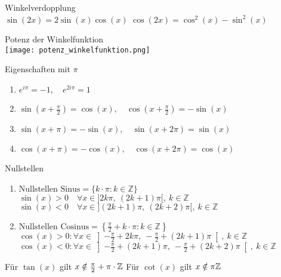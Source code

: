 \begin{corollary}{Winkelverdopplung}\\
        $\sin(2x) = 2 \sin(x)\cos(x)$ \hspace{4mm} $\cos(2x) = \cos^2(x) - \sin^2(x)$
\end{corollary}

\begin{corollary}{Potenz der Winkelfunktion}\\
    \texttt{[image: potenz\_winkelfunktion.png]}
\end{corollary}

\begin{corollary}{Eigenschaften mit $\pi$}
    \begin{enumerate}[itemsep= 2pt]
        \item $e^{i\pi} = -1, \quad e^{2i\pi} = 1$
        \item $\sin\left(x + \frac{\pi}{2}\right) = \cos(x), \quad \cos\left(x + \frac{\pi}{2}\right) = -\sin(x)$
        \item $\sin(x+\pi) = -\sin (x), \quad \sin(x + 2\pi) = \sin(x)$
        \item $\cos(x+\pi) = -\cos (x), \quad \cos(x + 2\pi) = \cos(x)$
    \end{enumerate}
\end{corollary}

\begin{corollary}{Nullstellen}
    \begin{enumerate}
         \item $\text{Nullstellen Sinus} = \{k\cdot \pi : k\in \mathbb{Z}\}$\\
        $\sin(x) > 0 \quad \forall x \in ]2k\pi, ~(2k+1)\pi[, ~ k\in \mathbb{Z}$\\[2pt]
        $\sin(x) < 0 \quad \forall x \in ](2k + 1)\pi, ~(2k+2)\pi[, ~ k\in \mathbb{Z}$
        \item $\text{Nullstellen Cosinus} = \left\{\frac{\pi}{2}+k\cdot \pi : k\in \mathbb{Z}\right\}$\\
        $\cos(x) > 0:\forall x \in \left]-\frac{\pi}{2} +2k\pi, ~-\frac{\pi}{2} +(2k+1)\pi\right[, ~ k\in \mathbb{Z}$\\[2pt]
        $\cos(x) < 0:\forall x \in \left]-\frac{\pi}{2} + (2k + 1)\pi, ~-\frac{\pi}{2} +(2k+2)\pi\right[, ~ k\in \mathbb{Z}$
    \end{enumerate}
\end{corollary}

\noindent Für $\tan(x)$ gilt $x \notin \frac{\pi}{2} + \pi \cdot \mathbb{Z}$ \qquad Für $\cot(x)$ gilt $x \notin \pi \mathbb{Z}$

